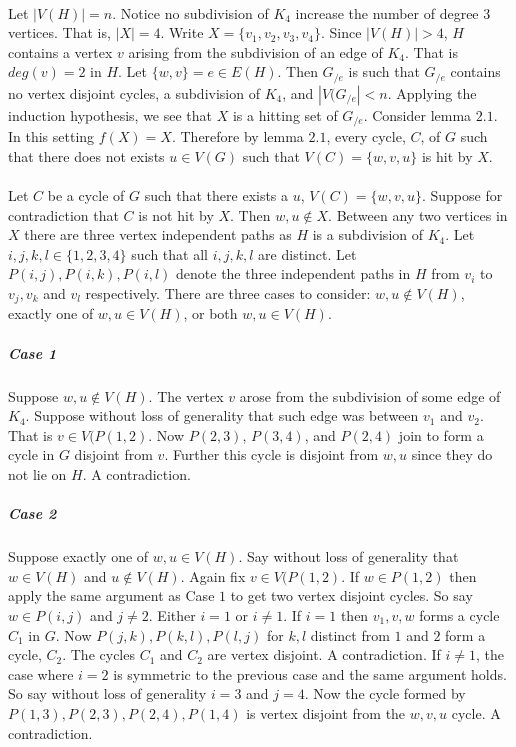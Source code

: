 \documentclass[letterpaper,12pt,oneside,onecolumn]{report}
\begin{document}
\paragraph{}
Let $|V(H)| = n$. Notice no subdivision of $K_4$ increase the number of degree $3$ vertices. That is, $|X| = 4$. Write $X = \{v_1, v_2, v_3, v_4\}$. Since $|V(H)| > 4$, $H$ contains a vertex $v$ arising from the subdivision of an edge of $K_4$. That is $deg(v) = 2$ in $H$. Let $\{w,v\} = e \in E(H)$. Then $G_{/e}$ is such that $G_{/e}$ contains no vertex disjoint cycles, a subdivision of $K_4$, and $|V(G_{/e}| < n$. Applying the induction hypothesis, we see that $X$ is a hitting set of $G_{/e}$. Consider lemma $2.1$. In this setting $f(X) = X$. Therefore by lemma $2.1$, every cycle, $C$, of $G$ such that there does not exists $u \in V(G)$ such that $V(C) = \{w,v,u\}$ is hit by $X$.
\paragraph{}
Let $C$ be a cycle of $G$ such that there exists a $u$, $V(C) = \{w,v,u\}$. Suppose for contradiction that $C$ is not hit by $X$. Then $w, u \not\in X$. Between any two vertices in $X$ there are three vertex independent paths as $H$ is a subdivision of $K_4$. Let $i,j,k,l \in \{1,2,3,4\}$ such that all $i,j,k,l$ are distinct. Let $P(i,j),P(i,k),P(i,l)$ denote the three independent paths in $H$ from $v_i$ to $v_j,v_k$ and $v_l$ respectively. There are three cases to consider: $w, u \not \in V(H)$, exactly one of $w,u \in V(H)$, or both $w,u \in V(H)$.
\subparagraph{Case 1} Suppose $w,u \not\in V(H)$. The vertex $v$ arose from the subdivision of some edge of $K_4$. Suppose without loss of generality that such edge was between $v_1$ and $v_2$. That is $v \in V(P(1,2)$.  Now $P(2,3)$, $P(3,4)$, and $P(2,4)$ join to form a cycle in $G$ disjoint from $v$. Further this cycle is disjoint from $w,u$ since they do not lie on $H$. A contradiction.
\subparagraph{Case 2}
Suppose exactly one of $w,u \in V(H)$. Say without loss of generality that $w \in V(H)$ and $u \not \in V(H)$. Again fix $v \in V(P(1,2)$. If $w \in P(1,2)$ then apply the same argument as Case $1$ to get two vertex disjoint cycles. So say $w \in P(i,j)$ and $j \neq 2$. Either $i = 1$ or $i \neq 1$. If $i = 1$ then $v_1, v,w$ forms a cycle $C_1$ in $G$. Now $P(j,k),P(k,l),P(l,j)$ for $k,l$ distinct from $1$ and $2$ form a cycle, $C_2$. The cycles $C_1$ and $C_2$ are vertex disjoint. A contradiction. If $i \neq 1$, the case where $i = 2$ is symmetric to the previous case and the same argument holds. So say without loss of generality $i = 3$ and $j = 4$.  Now the cycle formed by $P(1,3),P(2,3),P(2,4),P(1,4)$ is vertex disjoint from the $w,v,u$ cycle. A contradiction.
\end{document}
